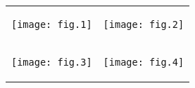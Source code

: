 \documentclass[a4paper,landscape]{article}
\begin{document}
\thispagestyle{empty}
\begin{tabular}{ c c } %
\begin{minipage}[t]{.5\textwidth}
    \begin{center}
    \texttt{[image: fig.1]}
    \end{center}
    \bigskip
\end{minipage}&
\begin{minipage}[t]{.5\textwidth}
    \begin{center}\texttt{[image: fig.2]}\end{center}
    \bigskip
\end{minipage}\\ %
\begin{minipage}[t]{.5\textwidth}
    \bigskip
    \begin{center}\texttt{[image: fig.3]}\end{center}
\end{minipage}&
\begin{minipage}[t]{.5\textwidth}
    \bigskip
    \begin{center}\texttt{[image: fig.4]}\end{center}
\end{minipage}\\ %
\end{tabular}
\end{document}
